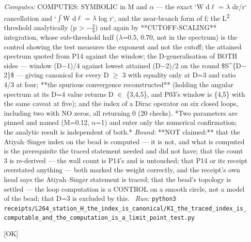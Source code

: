 \begin{description}
\emph{Computes:} COMPUTES: SYMBOLIC in M and \ensuremath{\alpha} --- the exact `W d\ensuremath{\ell} = \ensuremath{\lambda} dr/r` cancellation and `\ensuremath{\int}W d\ensuremath{\ell} = \ensuremath{\lambda} log r`, and the near-branch form of f; the L\textsuperscript{2} threshold analytically (p > \ensuremath{-}\ensuremath{\tfrac34}) and again by **CUTOFF-SCALING** integration, whose sub-threshold half (\ensuremath{\lambda}=0.5, 0.70, not in the spectrum) is the control showing the test measures the exponent and not the cutoff; the attained spectrum quoted from P14 against the window; the D-generalisation of BOTH sides --- window (D\ensuremath{-}1)/4 against lowest attained (D\ensuremath{-}2)/2 on the round \$S\textasciicircum{}\{D\ensuremath{-}2\}\$ --- giving canonical for every D \ensuremath{\ge} 3 with equality only at D=3 and ratio 4/3 at four; **the spurious convergence reconstructed** (holding the angular spectrum at its D=4 value returns D \ensuremath{\in} \{3,4,5\}, and P03's window is \{4,5\} with the same caveat at five); and the index of a Dirac operator on six closed loops, including two with NO zeros, all returning 0 (20 checks).  *Two parameters are pinned and named (M=0.12, \ensuremath{\alpha}=1) and enter only the numerical confirmation; the analytic result is independent of both.*
 \emph{Bound:} **NOT claimed:** that the Atiyah--Singer index on the bead is computed --- it is not, and what is computed is the prerequisite the traced statement needed and did not have; that the count 3 is re-derived --- the wall count is P14's and is untouched; that P14 or its receipt overstated anything --- both marked the weight correctly, and the receipt's own head says the Atiyah--Singer statement is traced; that the bead's topology is settled --- the loop computation is a CONTROL on a smooth circle, not a model of the bead; that D=3 is excluded by this.
\ \emph{Run:} \texttt{python3 receipts/L264\_station\_H\_the\_index\_is\_canonical/K1\_the\_traced\_index\_is\_computable\_and\_the\_computation\_is\_a\_limit\_point\_test.py}
\item[\label{rcpt:A1_the_atiyah_sequence_is_not_missing_from_P12_it_is_P12s_object_unnamed}\texttt{A1\_the\_atiyah\_sequence\_is\_not\_missing\_from\_P12\_it\_is\_P12s\_object\_unnamed}]\hfill\textsf{[OK]}\\

\end{description}
